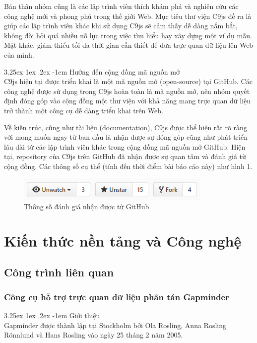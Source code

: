 \documentclass[12pt,a4paper]{article}
\makeatletter
\newcommand{\myparagraph}[1]{\paragraph{#1}\mbox{}\\} %
\renewcommand\paragraph{\@startsection{paragraph}{5}{\z@}%
  {3.25ex \@plus1ex \@minus.2ex}%
  {-1em}%
  {\normalfont\normalsize\bfseries}}
\makeatother
\begin{document}
Bản thân nhóm cũng là các lập trình viên thích khám phá và nghiên cứu các công nghệ mới và phong phú trong thế giới Web. Mục tiêu thư viện C9js đề ra là giúp các lập trình viên khác khi sử dụng C9js sẽ cảm thấy dễ dàng nắm bắt, không đòi hỏi quá nhiều nỗ lực trong việc tìm hiểu hay xây dựng một ví dụ mẫu. Mặt khác, giảm thiểu tối đa thời gian cần thiết để đưa trực quan dữ liệu lên Web của mình.

\myparagraph{Hướng đến cộng đồng mã nguồn mở}
C9js hiện tại được triển khai là một mã nguồn mở (open-source) tại GitHub\cite{c9js_github}. Các công nghệ được sử dụng trong C9js hoàn toàn là mã nguồn mở, nên nhóm quyết định đóng góp vào cộng đồng một thư viện với khả năng mang trực quan dữ liệu trở thành một công cụ dễ dàng triển khai trên Web. 

Về kiến trúc, cũng như tài liệu (documentation), C9js được thể hiện rất rõ ràng với mong muốn ngay từ ban đầu là nhận được sự đóng góp cũng như phát triển lâu dài từ các lập trình viên khác trong cộng đồng mã nguồn mở GitHub. Hiện tại, repository\cite{c9js_repo} của C9js trên GitHub đã nhận được sự quan tâm và đánh giá từ cộng đồng. Các thông số cụ thể (tính đến thời điểm bài báo cáo này) như hình 1.

\begin{figure}[htp]
	\begin{center}
    \includegraphics[scale=.8]{image/repo_status}
    \caption{Thông số đánh giá nhận được từ GitHub}
    \label{fig:repo_status}
	\end{center}
\end{figure}

\newpage
\section{Kiến thức nền tảng và Công nghệ}
\subsection{Công trình liên quan}\label{sec:related_work}
\subsubsection{Công cụ hỗ trợ trực quan dữ liệu phân tán Gapminder}
\myparagraph{Giới thiệu}
Gapminder\cite{gapminder} được thành lập tại Stockholm bởi Ola Rosling, Anna Rosling Rönnlund và Hans Rosling vào ngày 25 tháng 2 năm 2005. 
\end{document}
